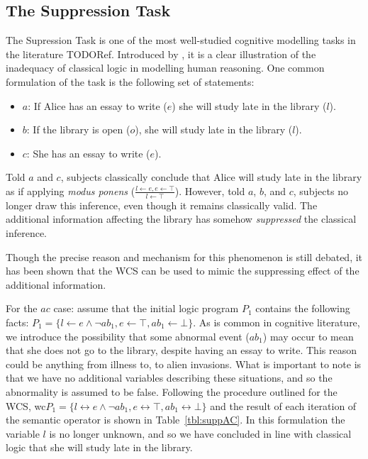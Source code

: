 \documentclass{article}
\begin{document}
\subsection{The Suppression Task} \label{ssec:suptask}
The Supression Task is one of the most well-studied cognitive modelling tasks in the literature TODORef. Introduced by \cite{byrne1989suppressing}, it is a clear illustration of the inadequacy of classical logic in modelling human reasoning. One common formulation of the task is the following set of statements:

\begin{itemize}
\item $a$: If Alice has an essay to write ($e$) she will study late in the library ($l$).
\item $b$: If the library is open ($o$), she will study late in the library ($l$).
\item $c$: She has an essay to write ($e$).
\end{itemize}

Told $a$ and $c$, subjects classically conclude that Alice will study late in the library as if applying \textit{modus ponens} ($ \frac{l \leftarrow e, e \leftarrow \top}{l \leftarrow \top}$). However, told $a$, $b$, and $c$, subjects no longer draw this inference, even though it remains classically valid. The additional information affecting the library has somehow \textit{suppressed} the classical inference.

Though the precise reason and mechanism for this phenomenon is still debated, it has been shown that the WCS can be used to mimic the suppressing effect of the additional information.

For the $ac$ case: assume that the initial logic program $P_1$ contains the following facts: $P_1=\{l\leftarrow e \land \lnot ab_1 , e \leftarrow\top, ab_1\leftarrow \bot\}$. As is common in cognitive literature, we introduce the possibility that some abnormal event ($ab_1$) may occur to mean that she does not go to the library, despite having an essay to write. This reason could be anything from illness to, to alien invasions. What is important to note is that we have no additional variables describing these situations, and so the abnormality is assumed to be false. Following the procedure outlined for the WCS, wc$P_1 = \{l\leftrightarrow e \land \lnot ab_1, e \leftrightarrow\top, ab_1\leftrightarrow \bot\}$ and the result of each iteration of the semantic operator is shown in Table~\ref{tbl:suppAC}. In this formulation the variable $l$ is no longer unknown, and so we have concluded in line with classical logic that she will study late in the library.
\end{document}
